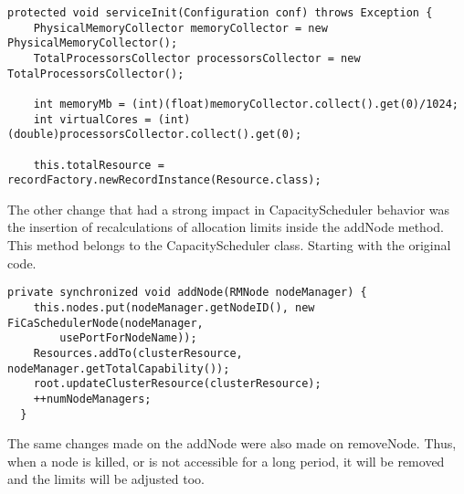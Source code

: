 \begin{lstlisting}
protected void serviceInit(Configuration conf) throws Exception {
	PhysicalMemoryCollector memoryCollector = new PhysicalMemoryCollector();
    TotalProcessorsCollector processorsCollector = new TotalProcessorsCollector();

    int memoryMb = (int)(float)memoryCollector.collect().get(0)/1024;
    int virtualCores = (int)(double)processorsCollector.collect().get(0);

    this.totalResource = recordFactory.newRecordInstance(Resource.class);
\end{lstlisting}

The other change that had a strong impact in CapacityScheduler behavior was the insertion of recalculations of allocation limits inside the addNode method. This method belongs to the CapacityScheduler class. Starting with the original code.

\begin{lstlisting}
private synchronized void addNode(RMNode nodeManager) {
    this.nodes.put(nodeManager.getNodeID(), new FiCaSchedulerNode(nodeManager,
        usePortForNodeName));
    Resources.addTo(clusterResource, nodeManager.getTotalCapability());
    root.updateClusterResource(clusterResource);
    ++numNodeManagers;
  }
\end{lstlisting}

The same changes made on the addNode were also made on removeNode. Thus, when a node is killed, or is not accessible for a long period, it will be removed and the limits will be adjusted too.

